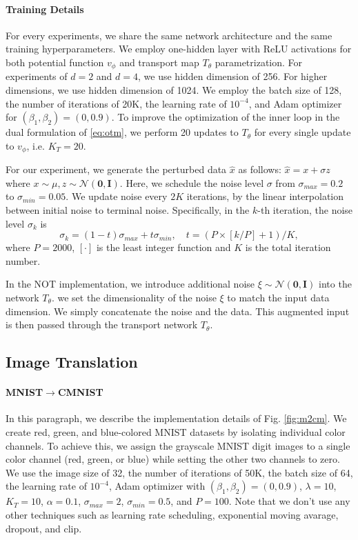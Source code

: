 \paragraph{Training Details}
For every experiments, we share the same network architecture and the same training hyperparameters.
We employ one-hidden layer with ReLU activations for both potential function $v_\phi$ and transport map $T_\theta$ parametrization.
For experiments of $d=2$ and $d=4$, we use hidden dimension of 256. For higher dimensions, we use hidden dimension of 1024.
We employ the batch size of 128, the number of iterations of 20K, the learning rate of $10^{-4}$, and Adam optimizer for $(\beta_1, \beta_2) = (0, 0.9)$. To improve the optimization of the inner loop in the dual formulation of \eqref{eq:otm}, we perform 20 updates to $T_\theta$ for every single update to $v_\phi$, i.e. $K_T = 20$.

For our experiment, we generate the perturbed data $\hat{x}$ as follows: $\hat{x} = x + \sigma z$ where $x\sim \mu, z\sim \mathcal{N}(\mathbf{0}, \mathbf{I})$.
Here, we schedule the noise level $\sigma$ from $\sigma_{max} = 0.2$ to $\sigma_{min} = 0.05$.
We update noise every $2K$ iterations, by the linear interpolation between initial noise to terminal noise. Specifically, in the $k$-th iteration, the noise level $\sigma_k$ is
\begin{equation}
    \sigma_k = (1-t) \sigma_{max} + t \sigma_{min}, \quad t = (P \times [k/P]+1) / K,
\end{equation}
where $P=2000$, $[\cdot]$ is the least integer function and $K$ is the total iteration number.

In the NOT \cite{not} implementation, we introduce additional noise $\xi \sim \mathcal{N}(\mathbf{0}, \mathbf{I})$ into the network $T_\theta$. we set the dimensionality of the noise $\xi$ to match the input data dimension. We simply concatenate the noise and the data. This augmented input is then passed through the transport network $T_\theta$.

\subsection{Image Translation}
\label{appen:exp_image}



\paragraph{MNIST$\rightarrow$CMNIST}
In this paragraph, we describe the implementation details of Fig. \ref{fig:m2cm}.
We create red, green, and blue-colored MNIST datasets by isolating individual color channels. To achieve this, we assign the grayscale MNIST digit images to a single color channel (red, green, or blue) while setting the other two channels to zero.
We use the image size of 32, the number of iterations of 50K, the batch size of 64, the learning rate of $10^{-4}$, Adam optimizer with $(\beta_1, \beta_2) = (0, 0.9)$, $\lambda=10$, $K_T=10$, $\alpha=0.1$, $\sigma_{max} = 2$, $\sigma_{min} = 0.5$, and $P=100$.
Note that we don't use any other techniques such as learning rate scheduling, exponential moving avarage, dropout, and clip.

